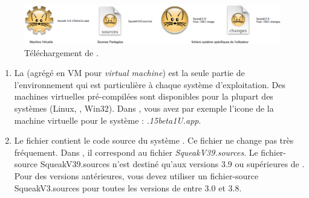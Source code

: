 \documentclass[a4paper,10pt,twoside]{book}
\begin{document}
\begin{figure}[htb]
\centerline {\includegraphics[width=\textwidth]{annotatedDownload}}
\caption{Téléchargement de \sq. \label{fig:download}}
\end{figure}

\begin{enumerate}


\item La  (agr\'eg\'e en VM pour
  \emph{virtual machine}) est la seule partie de l'environnement qui
  est particulière à chaque système d'exploitation. Des machines
  virtuelles pré-compilées sont disponibles pour la plupart des
  systèmes (Linux, \macosx, Win32). Dans , vous
  avez par exemple l'icone de la machine virtuelle pour le syst\`eme \macosx: \textit{.15beta1U.app}.


  \item Le fichier  contient le code source du système
    \sq. Ce fichier ne change pas tr\`es fréquement. Dans , il
    correspond au fichier \emph{SqueakV39.sources}. Le fichier-source SqueakV39.sources n'est destiné qu'aux versions 3.9 ou supérieures de \sq. Pour des versions antérieures, vous devez utiliser un fichier-source SqueakV3.sources pour toutes les versions de \sq entre 3.0 et 3.8.


\end{enumerate}
\end{document}
